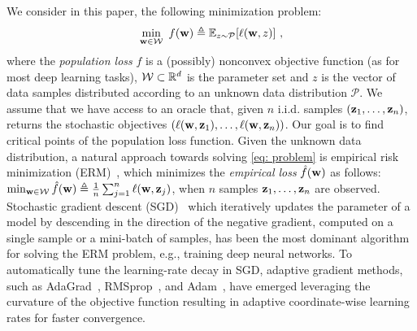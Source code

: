 \documentclass[11pt]{article}
\begin{document}
We consider in this paper, the following minimization problem:
\begin{equation} \label{eq: problem}
 \min_{\w \in \cW}~ f({\w})  \triangleq {\mathbb{E}_{z \sim \mathcal{P}}}[\ell(\w,z)]~,
\end{equation}
where the \emph{population loss} $f$ is a (possibly) nonconvex objective function (as for most deep learning tasks), $\cW \subset \R^d$ is the parameter set and $z$ is the vector of data samples distributed according to an unknown data distribution $\mathcal{P}$. 
We assume that we have access to an oracle that, given $n $ i.i.d. samples $(\mathbf{z}_{1}, \dots, \mathbf{z}_{n})$, returns the stochastic objectives $(\ell(\mathbf{w},\mathbf{z}_{1}), \dots, \ell(\mathbf{w},\mathbf{z}_{n}))$.
Our goal is to find critical points of the population loss function.
Given the unknown data distribution, a natural approach towards solving \eqref{eq: problem} is empirical risk minimization (ERM)~\citep{shbe14}, which minimizes the \emph{empirical loss} $\hat f(\mathbf{w})$ as follows: $\min_{\w \in \cW}     \hat f(\w)  \triangleq \frac{1}{n}\sum_{j =1}^{n} \ell(\w, \z_j)$, when $n$ samples $\mathbf{z}_{1}, \dots, \mathbf{z}_{n}$ are observed.
Stochastic gradient descent (SGD)~\citep{romo51} which iteratively updates the parameter of a model by descending in the direction of the negative gradient, computed on a single sample or a mini-batch of samples, has been the most dominant algorithm for solving the ERM problem, e.g., training deep neural networks. 
To automatically tune the learning-rate decay in SGD, adaptive gradient methods, such as AdaGrad~\citep{duha11}, RMSprop~\citep{tige12}, and Adam~\citep{kiba15}, have emerged leveraging the curvature of the objective function resulting in adaptive coordinate-wise learning rates for faster convergence.
\end{document}

